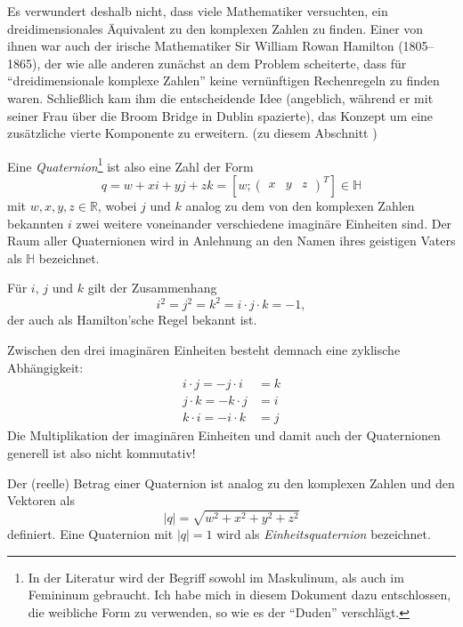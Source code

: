 Es verwundert deshalb nicht, dass viele Mathematiker versuchten, ein dreidimensionales Äquivalent zu den komplexen Zahlen zu finden. Einer von ihnen war auch der irische Mathematiker Sir William Rowan Hamilton (1805--1865), der wie alle anderen zunächst an dem Problem scheiterte, dass für \enquote{dreidimensionale komplexe Zahlen} keine vernünftigen Rechenregeln zu finden waren. Schließlich kam ihm die entscheidende Idee (angeblich, während er mit seiner Frau über die Broom Bridge in Dublin spazierte), das Konzept um eine zusätzliche vierte Komponente zu erweitern. (zu diesem Abschnitt )

Eine \emph{Quaternion}\footnote{In der Literatur wird der Begriff sowohl im Maskulinum, als auch im Femininum gebraucht. Ich habe mich in diesem Dokument dazu entschlossen, die weibliche Form zu verwenden, so wie es der \enquote{Duden} verschlägt.} ist also eine Zahl der Form
\begin{equation}
 q = w + xi + yj + zk = \left[ w; \begin{pmatrix} x & y & z \end{pmatrix}^T \right] \in \mathbb H
\end{equation}
mit $w, x, y, z \in \mathbb R$, wobei $j$ und $k$ analog zu dem von den komplexen Zahlen bekannten $i$ zwei weitere voneinander verschiedene imaginäre Einheiten sind. Der Raum aller Quaternionen wird in Anlehnung an den Namen ihres geistigen Vaters als $\mathbb H$ bezeichnet.

Für $i$, $j$ und $k$ gilt der Zusammenhang
\begin{equation}
 i^2 = j^2 = k^2 = i \cdot j \cdot k = -1,
\end{equation} 
der auch als Hamilton'sche Regel bekannt ist.

Zwischen den drei imaginären Einheiten besteht demnach eine zyklische Abhängigkeit:
\begin{align}
 i \cdot j = -j \cdot i &= k \\
 j \cdot k = -k \cdot j &= i \\
 k \cdot i = -i \cdot k &= j
\end{align}
Die Multiplikation der imaginären Einheiten und damit auch der Quaternionen generell ist also nicht kommutativ!

Der (reelle) Betrag einer Quaternion ist analog zu den komplexen Zahlen und den Vektoren als 
\begin{equation}
 \left| q \right| = \sqrt{w^2 + x^2 + y^2 + z^2}
\end{equation}
definiert. Eine Quaternion mit $\left| q \right| = 1$ wird als \emph{Einheitsquaternion} bezeichnet.


